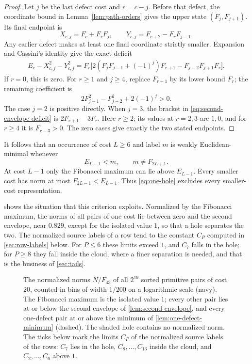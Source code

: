 \begin{proof}
Let $j$ be the last defect cost and $r=c-j$. Before that defect,
the coordinate bound in Lemma~\ref{lem:path-orders} gives the upper
state $(F_j,F_{j+1})$. Its final endpoint is
$$
 X_{c,j}=F_c+F_rF_j,\qquad
 Y_{c,j}=F_{c+2}-F_rF_{j-1}.
$$
Any earlier defect makes at least one final coordinate strictly smaller.
Expansion and Cassini's identity give the exact deficit
\begin{align}\label{eq:second-envelope-deficit}
 E_c-X_{c,j}^2-Y_{c,j}^2
 =F_r\bigl[
 2(F_jF_{j-1}+(-1)^j)F_{r+1}
 -F_{j-2}F_{j+1}F_r\bigr].
\end{align}
If $r=0$, this is zero. For $r\geqslant1$ and $j\geqslant4$,
replace $F_{r+1}$ by its lower bound $F_r$; the remaining coefficient is
$$
 2F_{j-1}^2-F_{j-2}^2+2(-1)^j>0.
$$
The case $j=2$ is positive directly. When $j=3$, the bracket in
\eqref{eq:second-envelope-deficit} is $2F_{r+1}-3F_r$.
Here $r\geqslant2$; its values at $r=2,3$ are $1,0$, and for
$r\geqslant4$ it is $F_{r-3}>0$. The zero cases give exactly the
two stated endpoints.
\end{proof}

It follows that an occurrence of cost $L\geqslant6$ and label $m$ is
weakly Euclidean-minimal whenever
\begin{equation}\label{eq:one-hole}
 E_{L-1}<m,\qquad m\ne F_{2L+1}.
\end{equation}
At cost $L-1$ only the Fibonacci maximum can lie above $E_{L-1}$.
Every smaller cost has norm at most
$F_{2L-1}<E_{L-1}$. Thus \eqref{eq:one-hole} excludes every
smaller-cost representation.

 shows the situation that this criterion exploits.
Normalized by the Fibonacci maximum, the norms of all pairs of one cost
lie between zero and the second envelope, near $0.829$, except for the
isolated value $1$, so that a hole separates the two. The normalized source labels
of a row tend to the constant $C_P$ computed in \cref{sec:row-labels} below.
For $P\leqslant6$ these limits exceed $1$, and $C_7$ falls in the hole; for
$P\geqslant8$ they fall inside the cloud, where a finer separation is needed,
and that is the business of \cref{sec:tails}.

\begin{figure}[tb]
\centering

\caption{The normalized norms $N/F_{43}$ of all $2^{19}$ sorted primitive pairs
of cost $20$, counted in bins of width $1/200$ on a logarithmic scale (navy).
The Fibonacci maximum is the isolated value $1$; every other pair lies at or
below the second envelope of \cref{lem:second-envelope}, and every
one-defect pair at or above the minimum of \cref{lem:one-defect-minimum}
(dashed). The shaded hole contains no normalized norm. The ticks below mark
the limits $C_P$ of the normalized source labels of the rows: $C_7$ lies in
the hole, $C_8,\ldots,C_{13}$ inside the cloud, and $C_2,\ldots,C_6$ above $1$.}
\label{fig:norm-cloud}
\end{figure}

